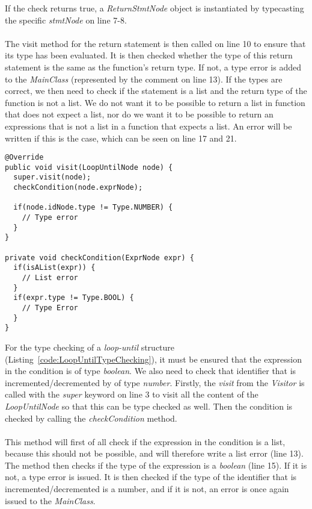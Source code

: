 If the check returns true, a \textit{ReturnStmtNode} object is instantiated by typecasting the specific \textit{stmtNode} on line 7-8.
\\\\
The visit method for the return statement is then called on line 10 to ensure that its type has been evaluated. It is then checked whether the type of this return statement is the same as the function's return type. If not, a type error is added to the \textit{MainClass} (represented by the comment on line 13). If the types are correct, we then need to check if the statement is a list and the return type of the function is not a list. We do not want it to be possible to return a list in function that does not expect a list, nor do we want it to be possible to return an expressions that is not a list in a function that expects a list. An error will be written if this is the case, which can be seen on line 17 and 21.

\begin{lstlisting}[caption={Type checking for loop until}, label={code:LoopUntilTypeChecking}]
@Override
public void visit(LoopUntilNode node) {
  super.visit(node);
  checkCondition(node.exprNode);
		
  if(node.idNode.type != Type.NUMBER) {
    // Type error
  }
}

private void checkCondition(ExprNode expr) {
  if(isAList(expr)) {
    // List error
  }
  if(expr.type != Type.BOOL) {
    // Type Error
  }
}
\end{lstlisting}
For the type checking of a \textit{loop-until} structure (Listing~\ref{code:LoopUntilTypeChecking}), it must be ensured that the expression in the condition is of type \textit{boolean}. 
We also need to check that identifier that is incremented/decremented by of type \textit{number}. 
Firstly, the \textit{visit} from the \textit{Visitor} is called with the \textit{super} keyword on line 3 to visit all the content of the \textit{LoopUntilNode} so that this can be type checked as well. 
Then the condition is checked by calling the \textit{checkCondition} method. 
\\\\
This method will first of all check if the expression in the condition is a list, because this should not be possible, and will therefore write a list error (line 13). 
The method then checks if the type of the expression is a \textit{boolean} (line 15). 
If it is not, a type error is issued. 
It is then checked if the type of the identifier that is incremented/decremented is a number, and if it is not, an error is once again issued to the \textit{MainClass}.

